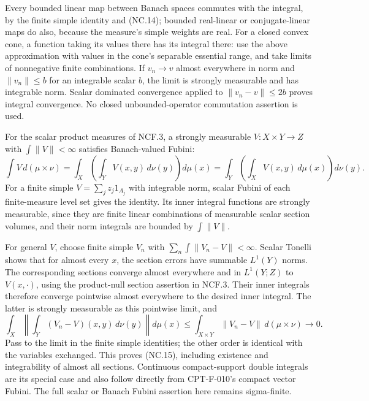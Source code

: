 \documentclass[
  11pt,
]{article}
\begin{document}
Every bounded linear map between Banach spaces commutes with the
integral, by the finite simple identity and (NC.14); bounded real-linear
or conjugate-linear maps do also, because the measure's simple weights
are real. For a closed convex cone, a function taking its values there
has its integral there: use the above approximation with values in the
cone's separable essential range, and take limits of nonnegative finite
combinations. If \(v_n\to v\) almost everywhere in norm and
\(\|v_n\|\leq b\) for an integrable scalar \(b\), the limit is strongly
measurable and has integrable norm. Scalar dominated convergence applied
to \(\|v_n-v\|\leq2b\) proves integral convergence. No closed
unbounded-operator commutation assertion is used.

For the scalar product measures of NCF.3, a strongly measurable
\(V:X\times Y\to Z\) with \(\int\|V\|<\infty\) satisfies Banach-valued
Fubini: \[
 \int V\,d(\mu\times\nu)
 =\int_X\left(\int_YV(x,y)\,d\nu(y)\right)d\mu(x)
 =\int_Y\left(\int_XV(x,y)\,d\mu(x)\right)d\nu(y).        \tag{NC.15}
\] For a finite simple \(V=\sum_jz_j1_{A_j}\) with integrable norm,
scalar Fubini of each finite-measure level set gives the identity. Its
inner integral functions are strongly measurable, since they are finite
linear combinations of measurable scalar section volumes, and their norm
integrals are bounded by \(\int\|V\|\).

For general \(V\), choose finite simple \(V_n\) with
\(\sum_n\int\|V_n-V\|<\infty\). Scalar Tonelli shows that for almost
every \(x\), the section errors have summable \(L^1(Y)\) norms. The
corresponding sections converge almost everywhere and in \(L^1(Y;Z)\) to
\(V(x,\cdot)\), using the product-null section assertion in NCF.3. Their
inner integrals therefore converge pointwise almost everywhere to the
desired inner integral. The latter is strongly measurable as this
pointwise limit, and \[
 \int_X\left\|\int_Y(V_n-V)(x,y)\,d\nu(y)\right\|d\mu(x)
 \leq\int_{X\times Y}\|V_n-V\|\,d(\mu\times\nu)
 \longrightarrow0.
\] Pass to the limit in the finite simple identities; the other order is
identical with the variables exchanged. This proves (NC.15), including
existence and integrability of almost all sections. Continuous
compact-support double integrals are its special case and also follow
directly from CPT-F-010's compact vector Fubini. The full scalar or
Banach Fubini assertion here remains sigma-finite.
\end{document}
